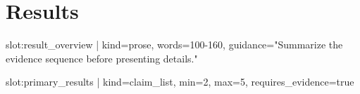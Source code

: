\section{Results}

{{slot:result_overview | kind=prose, words=100-160, guidance="Summarize the evidence sequence before presenting details."}}

{{slot:primary_results | kind=claim_list, min=2, max=5, requires_evidence=true}}

